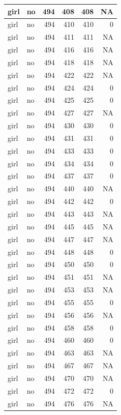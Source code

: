 \documentclass[man]{apa6}
\begin{document}
\begin{tabular}{l|l|r|r|r|r}
\hline
girl & no & 494 & 408 & 408 & NA\\
\hline
girl & no & 494 & 410 & 410 & 0\\
\hline
girl & no & 494 & 411 & 411 & NA\\
\hline
girl & no & 494 & 416 & 416 & NA\\
\hline
girl & no & 494 & 418 & 418 & NA\\
\hline
girl & no & 494 & 422 & 422 & NA\\
\hline
girl & no & 494 & 424 & 424 & 0\\
\hline
girl & no & 494 & 425 & 425 & 0\\
\hline
girl & no & 494 & 427 & 427 & NA\\
\hline
girl & no & 494 & 430 & 430 & 0\\
\hline
girl & no & 494 & 431 & 431 & 0\\
\hline
girl & no & 494 & 433 & 433 & 0\\
\hline
girl & no & 494 & 434 & 434 & 0\\
\hline
girl & no & 494 & 437 & 437 & 0\\
\hline
girl & no & 494 & 440 & 440 & NA\\
\hline
girl & no & 494 & 442 & 442 & 0\\
\hline
girl & no & 494 & 443 & 443 & NA\\
\hline
girl & no & 494 & 445 & 445 & NA\\
\hline
girl & no & 494 & 447 & 447 & NA\\
\hline
girl & no & 494 & 448 & 448 & 0\\
\hline
girl & no & 494 & 450 & 450 & 0\\
\hline
girl & no & 494 & 451 & 451 & NA\\
\hline
girl & no & 494 & 453 & 453 & NA\\
\hline
girl & no & 494 & 455 & 455 & 0\\
\hline
girl & no & 494 & 456 & 456 & NA\\
\hline
girl & no & 494 & 458 & 458 & 0\\
\hline
girl & no & 494 & 460 & 460 & 0\\
\hline
girl & no & 494 & 463 & 463 & NA\\
\hline
girl & no & 494 & 467 & 467 & NA\\
\hline
girl & no & 494 & 470 & 470 & NA\\
\hline
girl & no & 494 & 472 & 472 & 0\\
\hline
girl & no & 494 & 476 & 476 & NA\\

\end{tabular}
\end{document}
